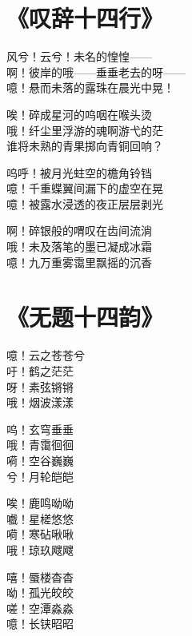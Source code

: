 \clearpage


\section{《叹辞十四行》}

风兮！云兮！未名的惶惶—— \\
啊！彼岸的哦——垂垂老去的呀—— \\
噫！悬而未落的露珠在晨光中晃！
\vspace{1em}

唉！碎成星河的呜咽在喉头烫 \\
哦！纤尘里浮游的魂啊游弋的茫 \\
谁将未熟的青果掷向青铜回响？
\vspace{1em}

呜呼！被月光蛀空的檐角铃铛 \\
噫！千重蝶翼间漏下的虚空在晃 \\
噫！被露水浸透的夜正层层剥光
\vspace{1em}

啊！碎银般的喟叹在齿间流淌 \\
哦！未及落笔的墨已凝成冰霜 \\
噫！九万重雾霭里飘摇的沉香

\clearpage


\section{《无题十四韵》}

噫！云之苍苍兮 \\
吁！鹤之茫茫 \\
呀！素弦锵锵 \\
哦！烟波漾漾
\vspace{1em}

呜！玄穹垂垂 \\
哦！青霭徊徊 \\
嗬！空谷巍巍 \\
兮！月轮皑皑
\vspace{1em}

唉！鹿鸣呦呦 \\
嚱！星槎悠悠 \\
嗬！寒砧啾啾 \\
哦！琼玖飕飕
\vspace{1em}

嘻！蜃楼杳杳 \\
呦！孤光皎皎 \\
嗟！空潭淼淼 \\
噫！长铗昭昭

